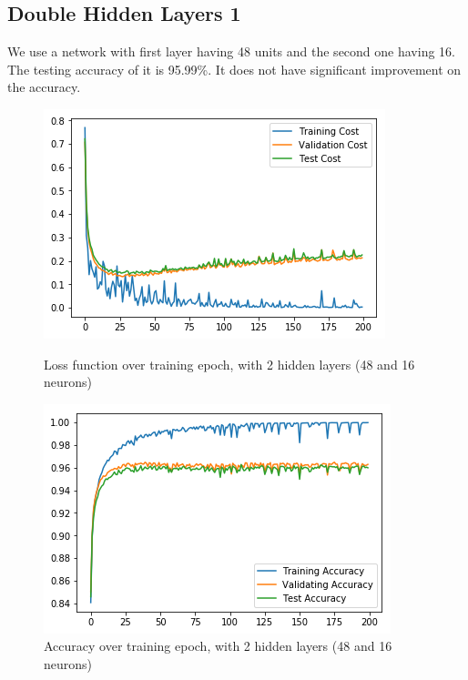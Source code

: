 \documentclass{article}
\begin{document}
\subsection{Double Hidden Layers 1}
We use a network with first layer having 48 units and the second one having 16. The testing accuracy of it is 95.99\%. It does not have significant improvement on the accuracy.
\begin{figure}[h]
	\begin{minipage}{0.48\textwidth}
	\centering
	\includegraphics[width=\textwidth]{pics/loss_double.png}
	\caption{Loss function over training epoch, with 2 hidden layers (48 and 16 neurons)}
	\end{minipage}\hfill
	\begin{minipage}{0.48\textwidth}
	\centering
	\includegraphics[width=\textwidth]{pics/acc_double.png}
	\caption{Accuracy over training epoch, with 2 hidden layers (48 and 16 neurons)}
	\end{minipage}
\end{figure}
\end{document}
